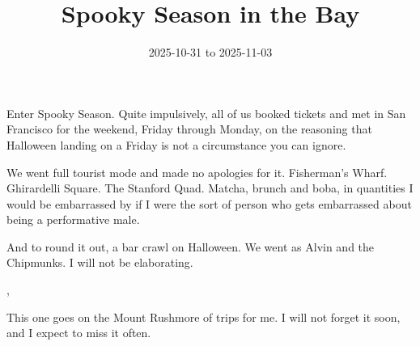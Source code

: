 
\title{Spooky Season in the Bay}
\date{2025-10-31 to 2025-11-03}




Enter Spooky Season. Quite impulsively, all of us booked tickets and met in San
Francisco for the weekend, Friday through Monday, on the reasoning that
Halloween landing on a Friday is not a circumstance you can ignore.


We went full tourist mode and made no apologies for it. Fisherman's Wharf.
Ghirardelli Square. The Stanford Quad. Matcha, brunch and boba, in quantities
I would be embarrassed by if I were the sort of person who gets embarrassed
about being a performative male.



And to round it out, a bar crawl on Halloween. We went as Alvin and the
Chipmunks. I will not be elaborating.

\sep

This one goes on the Mount Rushmore of trips for me. I will not forget it soon,
and I expect to miss it often.


